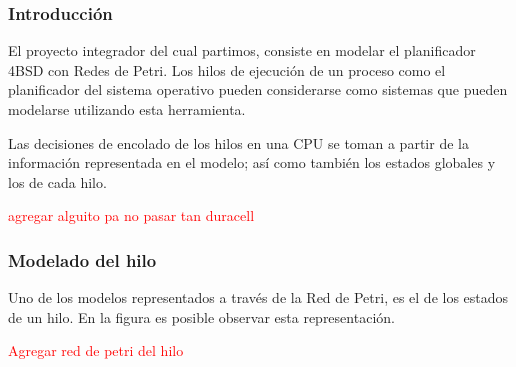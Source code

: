 \subsubsection{Introducción}

El proyecto integrador del cual partimos, consiste en modelar el planificador 4BSD con Redes de Petri. Los hilos de ejecución de un proceso como el planificador del sistema operativo pueden considerarse como sistemas que pueden modelarse utilizando esta herramienta.\par

Las decisiones de encolado de los hilos en una CPU se toman a partir de la información representada en el modelo; así como también los estados globales y los de cada hilo.\par

\textcolor{red}{agregar alguito pa no pasar tan duracell}

\subsubsection{Modelado del hilo}
Uno de los modelos representados a través de la Red de Petri, es el de los estados de un hilo. En la figura es posible observar esta representación.\par

\textcolor{red}{Agregar red de petri del hilo}

